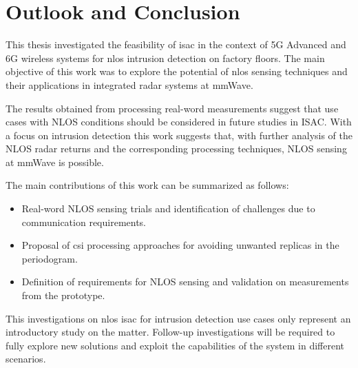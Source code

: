 \chapter{Outlook and Conclusion}

This thesis investigated the feasibility of \gls{isac} in the context of 5G Advanced and 6G wireless systems for \gls{nlos} intrusion detection on factory floors.
The main objective of this work was to explore the potential of \gls{nlos} sensing techniques and their applications in integrated radar systems at mmWave. 

The results obtained from processing real-word measurements suggest that use cases with NLOS conditions should be considered in future studies in ISAC.
With a focus on intrusion detection this work suggests that, with further analysis of the NLOS radar returns and the corresponding processing techniques, NLOS sensing at mmWave is possible.

The main contributions of this work can be summarized as follows:

\begin{itemize}
	\item Real-word NLOS sensing trials and identification of challenges due to communication requirements.
	\item Proposal of \gls{csi} processing approaches for avoiding unwanted replicas in the periodogram.
	\item Definition of requirements for NLOS sensing and validation on measurements from the prototype.
\end{itemize}

This investigations on \gls{nlos} \gls{isac} for intrusion detection use cases only represent an introductory study on the matter.
Follow-up investigations will be required to fully explore new solutions and exploit the capabilities of the system in different scenarios.
